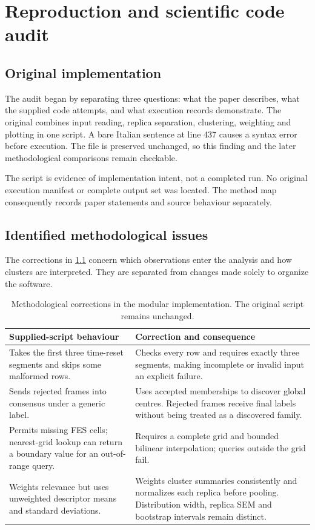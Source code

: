 \chapter{Reproduction and scientific code audit}
\label{ch:audit}
\section{Original implementation}
The audit began by separating three questions: what the paper describes, what the supplied code attempts, and what execution records demonstrate. The original combines input reading, replica separation, clustering, weighting and plotting in one script. A bare Italian sentence at line 437 causes a syntax error before execution. The file is preserved unchanged, so this finding and the later methodological comparisons remain checkable.

The script is evidence of implementation intent, not a completed run. No original execution manifest or complete output set was located. The method map consequently records paper statements and source behaviour separately.

\section{Identified methodological issues}
The corrections in \cref{tab:auditcorrections} concern which observations enter the analysis and how clusters are interpreted. They are separated from changes made solely to organize the software.

\begin{table}[htbp]
\centering
\begin{tabularx}{\textwidth}{@{}>{\raggedright\arraybackslash}p{}>{\raggedright\arraybackslash}X@{}}
\toprule
Supplied-script behaviour & Correction and consequence\\
\midrule
Takes the first three time-reset segments and skips some malformed rows.
& Checks every row and requires exactly three segments, making incomplete or invalid input an explicit failure.\\
\addlinespace
Sends rejected frames into consensus under a generic label.
& Uses accepted memberships to discover global centres. Rejected frames receive final labels without being treated as a discovered family.\\
\addlinespace
Permits missing FES cells; nearest-grid lookup can return a boundary value for an out-of-range query.
& Requires a complete grid and bounded bilinear interpolation; queries outside the grid fail.\\
\addlinespace
Weights relevance but uses unweighted descriptor means and standard deviations.
& Weights cluster summaries consistently and normalizes each replica before pooling. Distribution width, replica SEM and bootstrap intervals remain distinct.\\
\bottomrule
\end{tabularx}
\caption{Methodological corrections in the modular implementation. The original script remains unchanged.}
\label{tab:auditcorrections}
\end{table}

